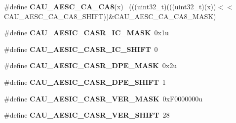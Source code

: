 \begin{DoxyCompactItemize}
\item 
\hypertarget{group___c_a_u___register___masks_gae2a77b06b95bcc56c79bbe79f1df2283}{}\#define {\bfseries C\+A\+U\+\_\+\+A\+E\+S\+C\+\_\+\+C\+A\+\_\+\+C\+A8}(x)                                          ~(((uint32\+\_\+t)(((uint32\+\_\+t)(x))$<$$<$C\+A\+U\+\_\+\+A\+E\+S\+C\+\_\+\+C\+A\+\_\+\+C\+A8\+\_\+\+S\+H\+I\+F\+T))\&C\+A\+U\+\_\+\+A\+E\+S\+C\+\_\+\+C\+A\+\_\+\+C\+A8\+\_\+\+M\+A\+S\+K)\label{group___c_a_u___register___masks_gae2a77b06b95bcc56c79bbe79f1df2283}

\item 
\hypertarget{group___c_a_u___register___masks_gacb80d3117440c08ed94005920ea5fb39}{}\#define {\bfseries C\+A\+U\+\_\+\+A\+E\+S\+I\+C\+\_\+\+C\+A\+S\+R\+\_\+\+I\+C\+\_\+\+M\+A\+S\+K}~0x1u\label{group___c_a_u___register___masks_gacb80d3117440c08ed94005920ea5fb39}

\item 
\hypertarget{group___c_a_u___register___masks_gaea31527fd7f5ac33f8a4eacdb62ae8bd}{}\#define {\bfseries C\+A\+U\+\_\+\+A\+E\+S\+I\+C\+\_\+\+C\+A\+S\+R\+\_\+\+I\+C\+\_\+\+S\+H\+I\+F\+T}~0\label{group___c_a_u___register___masks_gaea31527fd7f5ac33f8a4eacdb62ae8bd}

\item 
\hypertarget{group___c_a_u___register___masks_gafd8cf2f0aa0a4475cc5352b023839e02}{}\#define {\bfseries C\+A\+U\+\_\+\+A\+E\+S\+I\+C\+\_\+\+C\+A\+S\+R\+\_\+\+D\+P\+E\+\_\+\+M\+A\+S\+K}~0x2u\label{group___c_a_u___register___masks_gafd8cf2f0aa0a4475cc5352b023839e02}

\item 
\hypertarget{group___c_a_u___register___masks_ga45aa7619f775385221648659d5303807}{}\#define {\bfseries C\+A\+U\+\_\+\+A\+E\+S\+I\+C\+\_\+\+C\+A\+S\+R\+\_\+\+D\+P\+E\+\_\+\+S\+H\+I\+F\+T}~1\label{group___c_a_u___register___masks_ga45aa7619f775385221648659d5303807}

\item 
\hypertarget{group___c_a_u___register___masks_ga7c4921877f2a358cf58b360ae349d6e4}{}\#define {\bfseries C\+A\+U\+\_\+\+A\+E\+S\+I\+C\+\_\+\+C\+A\+S\+R\+\_\+\+V\+E\+R\+\_\+\+M\+A\+S\+K}~0x\+F0000000u\label{group___c_a_u___register___masks_ga7c4921877f2a358cf58b360ae349d6e4}

\item 
\hypertarget{group___c_a_u___register___masks_gac5a230498e5cdfde6c562f568d90acbf}{}\#define {\bfseries C\+A\+U\+\_\+\+A\+E\+S\+I\+C\+\_\+\+C\+A\+S\+R\+\_\+\+V\+E\+R\+\_\+\+S\+H\+I\+F\+T}~28\label{group___c_a_u___register___masks_gac5a230498e5cdfde6c562f568d90acbf}


\end{DoxyCompactItemize}

